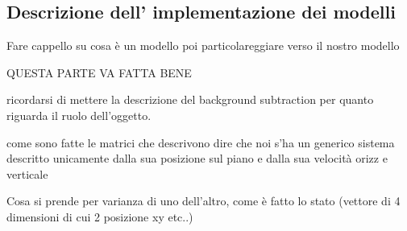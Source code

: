 \subsection{Descrizione dell' implementazione dei modelli}
Fare cappello su cosa è un modello poi particolareggiare verso il nostro modello

QUESTA PARTE VA FATTA BENE

ricordarsi di mettere la descrizione del background subtraction per quanto riguarda il ruolo dell'oggetto.

come sono fatte le matrici che descrivono 
dire che noi s'ha un generico sistema descritto unicamente dalla sua posizione sul piano e dalla sua velocità orizz e verticale

Cosa si prende per varianza di uno dell'altro, come è fatto lo stato (vettore di 4 dimensioni di cui 2 posizione xy etc..)
